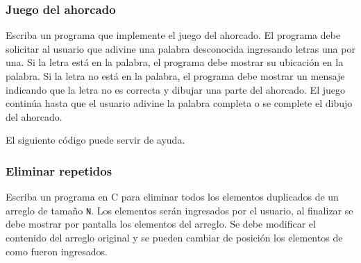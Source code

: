 \subsubsection{Juego del ahorcado}
Escriba un programa que implemente el juego del ahorcado.
El programa debe solicitar al usuario que adivine una palabra desconocida ingresando letras una por una.
Si la letra está en la palabra, el programa debe mostrar su ubicación en la palabra.
Si la letra no está en la palabra, el programa debe mostrar un mensaje indicando que la letra no es correcta y dibujar una parte del ahorcado.
El juego continúa hasta que el usuario adivine la palabra completa o se complete el dibujo del ahorcado.

El siguiente código puede servir de ayuda.

\lstset{inputencoding=utf8/latin1}


\subsubsection{Eliminar repetidos}
Escriba un programa en C para eliminar todos los elementos duplicados de un arreglo de tamaño \texttt{N}.
Los elementos serán ingresados por el usuario, al finalizar se debe mostrar por pantalla los elementos del arreglo.
Se debe modificar el contenido del arreglo original y se pueden cambiar de posición los elementos de como fueron ingresados.

\lstset{inputencoding=utf8/latin1}


{\small
  \lstset{inputencoding=utf8/latin1}
  
}

